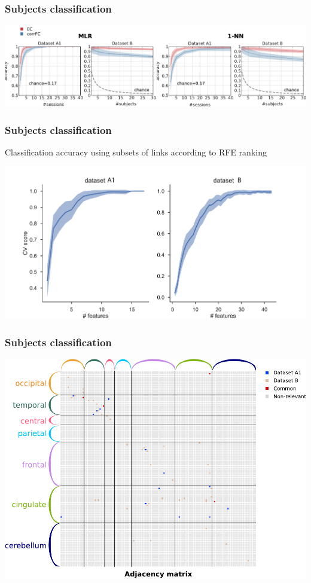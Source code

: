 \documentclass[final]{beamer}
\begin{document}
\begin{frame}
\frametitle{Subjects classification}
\begin{center}
\includegraphics[width=0.9\columnwidth,valign=b]{class_subj}
\end{center}
\end{frame}

\begin{frame}
\frametitle{Subjects classification}
Classification accuracy using subsets of links according to RFE ranking
\begin{center}
\includegraphics[width=0.8\columnwidth,valign=b]{subj_varying_links}
\end{center}
\end{frame}

\begin{frame}
\frametitle{Subjects classification}
\begin{center}
\includegraphics[width=0.8\columnwidth,valign=b]{subj_net}
\end{center}
\end{frame}
\end{document}
